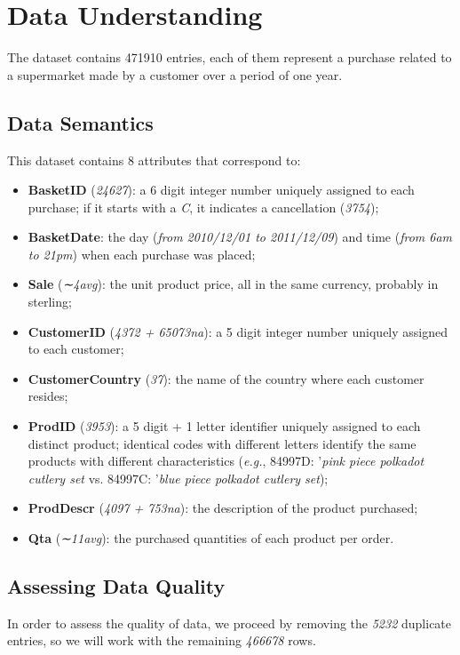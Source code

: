\section{Data Understanding}

The dataset contains 471910 entries, each of them represent a purchase related to a supermarket made by a customer over a period of one year.

\subsection{Data Semantics}

This dataset contains 8 attributes that correspond to:

\begin{itemize}
\item \textbf{BasketID} (\emph{24627}): a 6 digit integer number uniquely assigned to each purchase; if it starts with a \emph{C}, it indicates a cancellation (\emph{3754});
\item \textbf{BasketDate}: the day (\emph{from 2010/12/01 to 2011/12/09}) and time (\emph{from 6am to 21pm}) when each purchase was placed;
\item \textbf{Sale} (\emph{∼4avg}): the unit product price, all in the same currency, probably in sterling;
\item \textbf{CustomerID} (\emph{4372 + 65073na}): a 5 digit integer number uniquely assigned to each customer;
\item \textbf{CustomerCountry} (\emph{37}): the name of the country where each customer resides;
\item \textbf{ProdID} (\emph{3953}): a 5 digit + 1 letter identifier uniquely assigned to each distinct product; identical codes with different letters identify the same products with different characteristics (\emph{e.g.}, 84997D: '\emph{pink piece polkadot cutlery set} vs. 84997C: '\emph{blue piece polkadot cutlery set});
\item \textbf{ProdDescr} (\emph{4097 + 753na}): the description of the product purchased;
\item \textbf{Qta} (\emph{∼11avg}): the purchased quantities of each product per order.
\end{itemize}

\subsection{Assessing Data Quality}
In order to assess the quality of data, we proceed by removing the \emph{5232} duplicate entries, so we will work with the remaining \emph{466678} rows.

